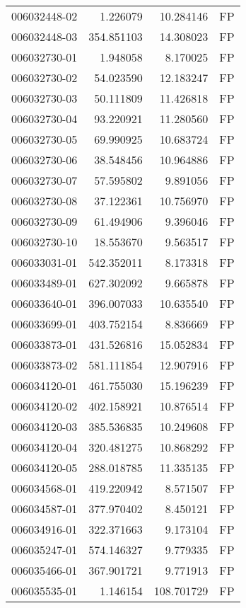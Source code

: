 \begin{tabular}{lrrl}
006032448-02 &    1.226079 &    10.284146 &   FP \\
006032448-03 &  354.851103 &    14.308023 &   FP \\
006032730-01 &    1.948058 &     8.170025 &   FP \\
006032730-02 &   54.023590 &    12.183247 &   FP \\
006032730-03 &   50.111809 &    11.426818 &   FP \\
006032730-04 &   93.220921 &    11.280560 &   FP \\
006032730-05 &   69.990925 &    10.683724 &   FP \\
006032730-06 &   38.548456 &    10.964886 &   FP \\
006032730-07 &   57.595802 &     9.891056 &   FP \\
006032730-08 &   37.122361 &    10.756970 &   FP \\
006032730-09 &   61.494906 &     9.396046 &   FP \\
006032730-10 &   18.553670 &     9.563517 &   FP \\
006033031-01 &  542.352011 &     8.173318 &   FP \\
006033489-01 &  627.302092 &     9.665878 &   FP \\
006033640-01 &  396.007033 &    10.635540 &   FP \\
006033699-01 &  403.752154 &     8.836669 &   FP \\
006033873-01 &  431.526816 &    15.052834 &   FP \\
006033873-02 &  581.111854 &    12.907916 &   FP \\
006034120-01 &  461.755030 &    15.196239 &   FP \\
006034120-02 &  402.158921 &    10.876514 &   FP \\
006034120-03 &  385.536835 &    10.249608 &   FP \\
006034120-04 &  320.481275 &    10.868292 &   FP \\
006034120-05 &  288.018785 &    11.335135 &   FP \\
006034568-01 &  419.220942 &     8.571507 &   FP \\
006034587-01 &  377.970402 &     8.450121 &   FP \\
006034916-01 &  322.371663 &     9.173104 &   FP \\
006035247-01 &  574.146327 &     9.779335 &   FP \\
006035466-01 &  367.901721 &     9.771913 &   FP \\
006035535-01 &    1.146154 &   108.701729 &   FP \\

\end{tabular}
